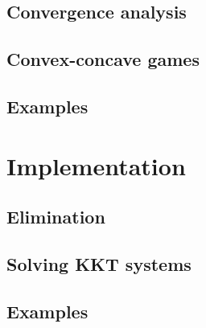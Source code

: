 \subsection{Convergence analysis}

\subsection{Convex-concave games}

\subsection{Examples}

\section{Implementation}

\subsection{Elimination}

\subsection{Solving KKT systems}

\subsection{Examples}
